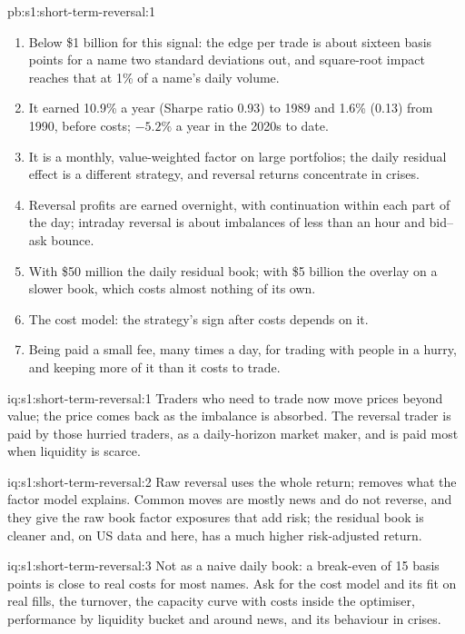 \begin{solution}{pb:s1:short-term-reversal:1}
\begin{enumerate}
the book that ignores them.
\item Below \$1 billion for this signal: the edge per trade is about sixteen basis points for a name two standard deviations out, and square-root impact reaches
that at 1\% of a name's daily volume.
\item It earned 10.9\% a year (Sharpe ratio 0.93) to 1989 and 1.6\% (0.13) from 1990, before costs; $-5.2\%$ a year in the 2020s to date.
\item It is a monthly, value-weighted factor on large portfolios; the daily residual effect is a different strategy, and reversal returns concentrate in crises.
\item Reversal profits are earned overnight, with continuation within each part of the day; intraday reversal is about imbalances of less than an hour and bid--ask
bounce.
\item With \$50 million the daily residual book; with \$5 billion the overlay on a slower book, which costs almost nothing of its own.
\item The cost model: the strategy's sign after costs depends on it.
\item Being paid a small fee, many times a day, for trading with people in a hurry, and keeping more of it than it costs to trade.
\end{enumerate}
\end{solution}

\begin{solution}{iq:s1:short-term-reversal:1}
Traders who need to trade now move prices beyond value; the price comes back as the imbalance is absorbed. The reversal trader is paid by those hurried traders,
as a daily-horizon market maker, and is paid most when liquidity is scarce.
\end{solution}

\begin{solution}{iq:s1:short-term-reversal:2}
Raw reversal uses the whole return;  removes what the factor model explains. Common moves are mostly news and do not reverse, and they give the
raw book factor exposures that add risk; the residual book is cleaner and, on US data and here, has a much higher risk-adjusted return.
\end{solution}

\begin{solution}{iq:s1:short-term-reversal:3}
Not as a naive daily book: a break-even of 15 basis points is close to real costs for most names. Ask for the cost model and its fit on real fills, the turnover,
the capacity curve with costs inside the optimiser, performance by liquidity bucket and around news, and its behaviour in crises.
\end{solution}


